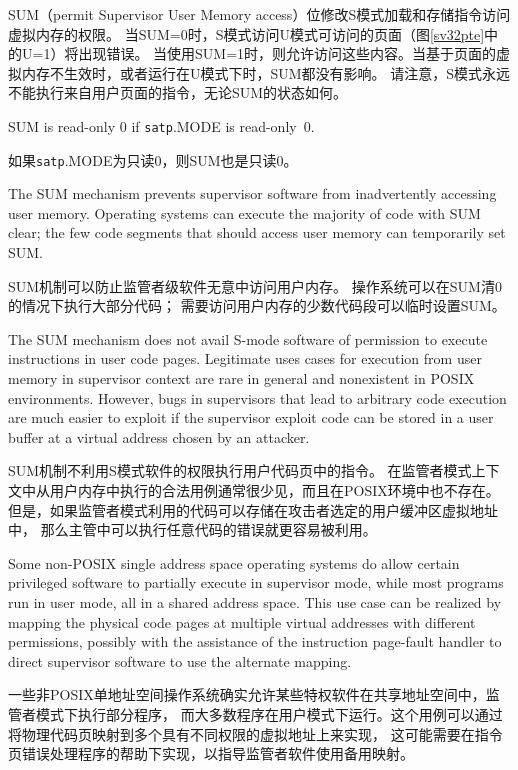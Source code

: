 SUM（permit Supervisor User Memory access）位修改S模式加载和存储指令访问虚拟内存的权限。
当SUM=0时，S模式访问U模式可访问的页面（图\ref{sv32pte}中的U=1）将出现错误。
当使用SUM=1时，则允许访问这些内容。当基于页面的虚拟内存不生效时，或者运行在U模式下时，SUM都没有影响。
请注意，S模式永远不能执行来自用户页面的指令，无论SUM的状态如何。

SUM is read-only 0 if {\tt satp}.MODE is read-only~0.

如果{\tt satp}.MODE为只读0，则SUM也是只读0。

\begin{commentary}

  The SUM mechanism prevents supervisor software from inadvertently accessing
  user memory.  Operating systems can execute the majority of code with SUM clear;
  the few code segments that should access user memory can temporarily set
  SUM.

SUM机制可以防止监管者级软件无意中访问用户内存。
操作系统可以在SUM清0的情况下执行大部分代码；
需要访问用户内存的少数代码段可以临时设置SUM。

The SUM mechanism does not avail S-mode software of permission to execute
instructions in user code pages.  Legitimate uses cases for execution from
user memory in supervisor context are rare in general and nonexistent in POSIX
environments.  However, bugs in supervisors that lead to arbitrary code
execution are much easier to exploit if the supervisor exploit code can be
stored in a user buffer at a virtual address chosen by an attacker.

SUM机制不利用S模式软件的权限执行用户代码页中的指令。
在监管者模式上下文中从用户内存中执行的合法用例通常很少见，而且在POSIX环境中也不存在。
但是，如果监管者模式利用的代码可以存储在攻击者选定的用户缓冲区虚拟地址中，
那么主管中可以执行任意代码的错误就更容易被利用。

Some non-POSIX single address space operating systems do allow certain
privileged software to partially execute in supervisor mode, while most
programs run in user mode, all in a shared address space.  This use case can
be realized by mapping the physical code pages at multiple virtual addresses
with different permissions, possibly with the assistance of the
instruction page-fault handler to direct supervisor software to use the
alternate mapping.

一些非POSIX单地址空间操作系统确实允许某些特权软件在共享地址空间中，监管者模式下执行部分程序，
而大多数程序在用户模式下运行。这个用例可以通过将物理代码页映射到多个具有不同权限的虚拟地址上来实现，
这可能需要在指令页错误处理程序的帮助下实现，以指导监管者软件使用备用映射。

\end{commentary}

